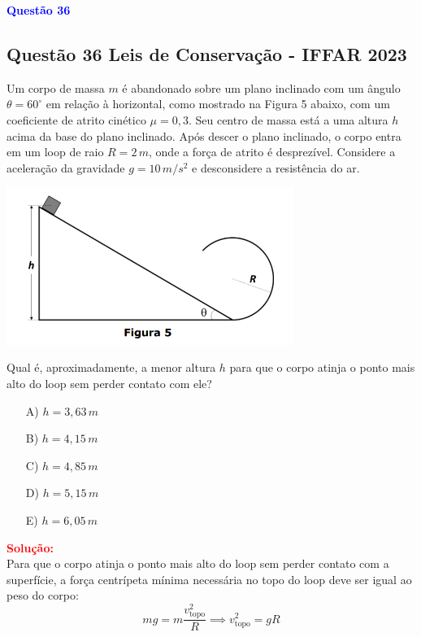 \documentclass[a4paper,12pt]{article}
\begin{document}
\begin{flushleft}
\textbf{\textcolor{blue}{\Large Quest\~ao 36}}\\
\noindent
\subsection{Quest\~ao 36 Leis de Conserva\c{c}\~ao - IFFAR 2023}
Um corpo de massa $m$ é abandonado sobre um plano inclinado com um ângulo 
$\theta = 60^\circ$ em relação à horizontal, como mostrado na Figura 5 abaixo, 
com um coeficiente de atrito cinético $\mu = 0{,}3$. Seu centro de massa está 
a uma altura $h$ acima da base do plano inclinado. Após descer o plano inclinado, 
o corpo entra em um loop de raio $R = 2\,m$, onde a força de atrito é desprezível. 
Considere a aceleração da gravidade $g = 10\,m/s^2$ e desconsidere a resistência do ar.

\begin{center}
\includegraphics[width=0.7\textwidth]{figures/loop.png} \\[0.3cm]
\end{center}

Qual é, aproximadamente, a menor altura $h$ para que o corpo atinja o ponto mais 
alto do loop sem perder contato com ele?

\begin{itemize}
\item[A)] $h = 3{,}63\,m$
\item[B)] $h = 4{,}15\,m$
\item[C)] $h = 4{,}85\,m$
\item[D)] $h = 5{,}15\,m$
\item[E)] $h = 6{,}05\,m$
\end{itemize}

\vspace{0.5cm}

\textcolor{red}{\textbf{Solução:}}\\

Para que o corpo atinja o ponto mais alto do loop sem perder contato com a superfície, a força centrípeta mínima necessária no topo do loop deve ser igual ao peso do corpo:
\[
m g = m \frac{v_{\text{topo}}^2}{R} \implies v_{\text{topo}}^2 = gR
\]


\end{flushleft}
\end{document}
